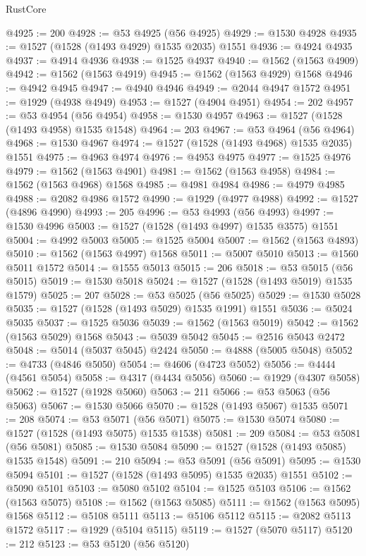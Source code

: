 \begin{lexlean}{RustCore}
\begin{coremodule}
@4925 := 200
@4928 := @53 @4925 (@56 @4925)
@4929 := @1530 @4928
@4935 := @1527 (@1528 (@1493 @4929) @1535 @2035) @1551
@4936 := @4924 @4935
@4937 := @4914 @4936
@4938 := @1525 @4937
@4940 := @1562 (@1563 @4909)
@4942 := @1562 (@1563 @4919)
@4945 := @1562 (@1563 @4929) @1568
@4946 := @4942 @4945
@4947 := @4940 @4946
@4949 := @2044 @4947 @1572
@4951 := @1929 (@4938 @4949)
@4953 := @1527 (@4904 @4951)
@4954 := 202
@4957 := @53 @4954 (@56 @4954)
@4958 := @1530 @4957
@4963 := @1527 (@1528 (@1493 @4958) @1535 @1548)
@4964 := 203
@4967 := @53 @4964 (@56 @4964)
@4968 := @1530 @4967
@4974 := @1527 (@1528 (@1493 @4968) @1535 @2035) @1551
@4975 := @4963 @4974
@4976 := @4953 @4975
@4977 := @1525 @4976
@4979 := @1562 (@1563 @4901)
@4981 := @1562 (@1563 @4958)
@4984 := @1562 (@1563 @4968) @1568
@4985 := @4981 @4984
@4986 := @4979 @4985
@4988 := @2082 @4986 @1572
@4990 := @1929 (@4977 @4988)
@4992 := @1527 (@4896 @4990)
@4993 := 205
@4996 := @53 @4993 (@56 @4993)
@4997 := @1530 @4996
@5003 := @1527 (@1528 (@1493 @4997) @1535 @3575) @1551
@5004 := @4992 @5003
@5005 := @1525 @5004
@5007 := @1562 (@1563 @4893)
@5010 := @1562 (@1563 @4997) @1568
@5011 := @5007 @5010
@5013 := @1560 @5011 @1572
@5014 := @1555 @5013
@5015 := 206
@5018 := @53 @5015 (@56 @5015)
@5019 := @1530 @5018
@5024 := @1527 (@1528 (@1493 @5019) @1535 @1579)
@5025 := 207
@5028 := @53 @5025 (@56 @5025)
@5029 := @1530 @5028
@5035 := @1527 (@1528 (@1493 @5029) @1535 @1991) @1551
@5036 := @5024 @5035
@5037 := @1525 @5036
@5039 := @1562 (@1563 @5019)
@5042 := @1562 (@1563 @5029) @1568
@5043 := @5039 @5042
@5045 := @2516 @5043 @2472
@5048 := @5014 (@5037 @5045) @2424
@5050 := @4888 (@5005 @5048)
@5052 := @4733 (@4846 @5050)
@5054 := @4606 (@4723 @5052)
@5056 := @4444 (@4561 @5054)
@5058 := @4317 (@4434 @5056)
@5060 := @1929 (@4307 @5058)
@5062 := @1527 (@1928 @5060)
@5063 := 211
@5066 := @53 @5063 (@56 @5063)
@5067 := @1530 @5066
@5070 := @1528 (@1493 @5067) @1535
@5071 := 208
@5074 := @53 @5071 (@56 @5071)
@5075 := @1530 @5074
@5080 := @1527 (@1528 (@1493 @5075) @1535 @1538)
@5081 := 209
@5084 := @53 @5081 (@56 @5081)
@5085 := @1530 @5084
@5090 := @1527 (@1528 (@1493 @5085) @1535 @1548)
@5091 := 210
@5094 := @53 @5091 (@56 @5091)
@5095 := @1530 @5094
@5101 := @1527 (@1528 (@1493 @5095) @1535 @2035) @1551
@5102 := @5090 @5101
@5103 := @5080 @5102
@5104 := @1525 @5103
@5106 := @1562 (@1563 @5075)
@5108 := @1562 (@1563 @5085)
@5111 := @1562 (@1563 @5095) @1568
@5112 := @5108 @5111
@5113 := @5106 @5112
@5115 := @2082 @5113 @1572
@5117 := @1929 (@5104 @5115)
@5119 := @1527 (@5070 @5117)
@5120 := 212
@5123 := @53 @5120 (@56 @5120)

\end{coremodule}
\end{lexlean}
